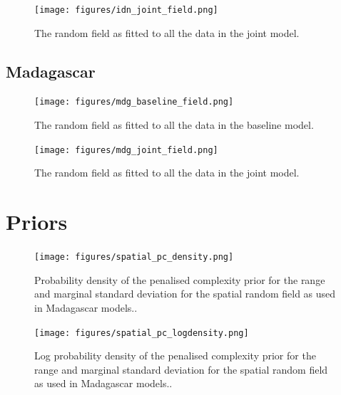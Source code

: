 \documentclass[10pt,a4]{article}
\begin{document}
\begin{figure}[h!]
\centering

\texttt{[image: figures/idn\_joint\_field.png]}

\caption{The random field as fitted to all the data in the joint model.}
\label{jointfieldidn}
\end{figure}



\clearpage
\subsection{Madagascar}





\begin{figure}[h!]
\centering

\texttt{[image: figures/mdg\_baseline\_field.png]}

\caption{The random field as fitted to all the data in the baseline model.}
\label{baselinefieldmdg}
\end{figure}




\begin{figure}[h!]
     \centering
     \label{gpsencov}
\end{figure}




\begin{figure}[h!]
\centering

\texttt{[image: figures/mdg\_joint\_field.png]}

\caption{The random field as fitted to all the data in the joint model.}
\label{jointfieldidn}
\end{figure}



\clearpage
\section{Priors}



\begin{figure}[h!]
\centering

\texttt{[image: figures/spatial\_pc\_density.png]}

\caption{Probability density of the penalised complexity prior for the range and marginal standard deviation for the spatial random field as used in Madagascar models..}
\label{dens}
\end{figure}



\begin{figure}[h!]
\centering

\texttt{[image: figures/spatial\_pc\_logdensity.png]}


\caption{Log probability density of the penalised complexity prior for the range and marginal standard deviation for the spatial random field as used in Madagascar models..}
\label{logdens}
\end{figure}
\end{document}
